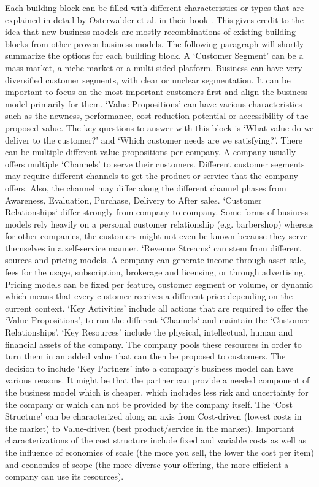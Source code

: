 		Each building block can be filled with different characteristics or types that are explained in detail by Osterwalder et al. in their book \cite{osterwalder}. This gives credit to the idea that new business models are mostly  recombinations of existing building blocks from other proven business models. The following paragraph will shortly summarize the options for each building block. A `Customer Segment' can be a mass market, a niche market or a multi-sided platform. Business can have very diversified customer segments, with clear or unclear segmentation. It can be important to focus on the most important customers first and align the business model primarily for them. `Value Propositions' can have various characteristics such as the newness, performance, cost reduction potential or accessibility of the proposed value. The key questions to answer with this block is `What value do we deliver to the customer?' and `Which customer needs are we satisfying?'. There can be multiple different value propositions per company. A company usually offers multiple `Channels' to serve their customers. Different customer segments may require different channels to get the product or service that the company offers. Also, the channel may differ along the different channel phases from Awareness, Evaluation, Purchase, Delivery to After sales. `Customer Relationships` differ strongly from company to company. Some forms of business models rely heavily on a personal customer relationship (e.g. barbershop) whereas for other companies, the customers might not even be known because they serve themselves in a self-service manner. `Revenue Streams` can stem from different sources and pricing models. A company can generate income through asset sale, fees for the usage, subscription, brokerage and licensing, or through advertising. Pricing models can be fixed per feature, customer segment or volume, or dynamic which means that every customer receives a different price depending on the current context. `Key Activities' include all actions that are required to offer the `Value Propositions', to run the different `Channels` and maintain the `Customer Relationships'. `Key Resources' include the physical, intellectual, human and financial assets of the company. The company pools these resources in order to turn them in an added value that can then be proposed to customers. The decision to include `Key Partners' into a company's business model can have various reasons. It might be that the partner can provide a needed component of the business model which is cheaper, which includes less risk and uncertainty for the company or which can not be provided by the company itself. The `Cost Structure' can be characterized along an axis from Cost-driven (lowest costs in the market) to Value-driven (best product/service in the market). Important characterizations of the cost structure include fixed and variable costs as well as the influence of economies of scale (the more you sell, the lower the cost per item) and economies of scope (the more diverse your offering, the more efficient a company can use its resources).

